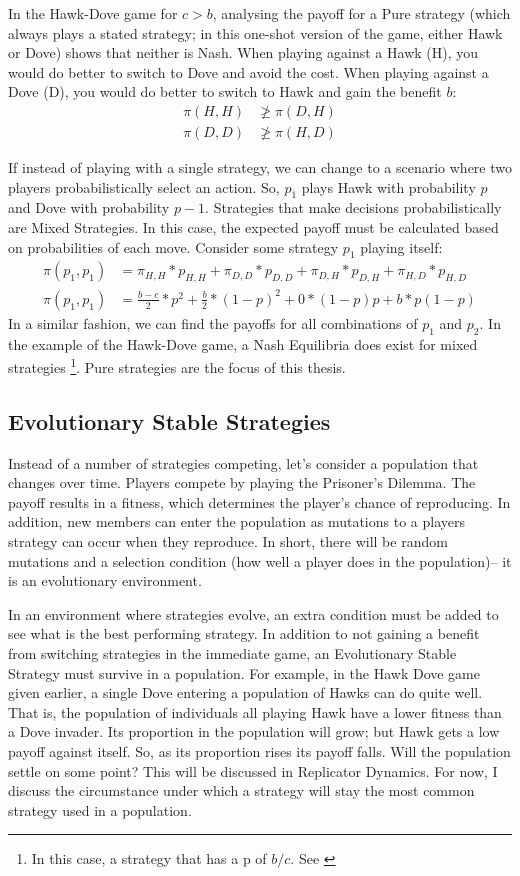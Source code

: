 \documentclass[a4paper,11pt,bcshonoursthesis,singlespace,twoside,thesisdraft,pdflatex]{cssethesis}
\renewcommand{\cite}{\citep} %
\begin{document}
In the Hawk-Dove game for $c>b$, analysing the payoff for a Pure strategy (which always plays a stated strategy; in this one-shot version of the game, either Hawk or Dove) shows that neither is Nash. 
When playing against a Hawk (H), you would do better to switch to Dove and avoid the cost. 
When playing against a Dove (D), you would do better to switch to Hawk and gain the benefit $b$:
\begin{align*}
\pi(H,H)&\ngeq \pi(D,H)\\
\pi(D,D)&\ngeq \pi(H,D)
\end{align*}

If instead of playing with a single strategy, we can change to a scenario where two players probabilistically select an action. So, $p_1$ plays Hawk with probability $p$ and Dove with probability $p-1$. Strategies that make decisions probabilistically are Mixed Strategies. 
In this case, the expected payoff must be calculated based on  probabilities of each move. 
Consider some strategy $p_1$ playing itself: 
\begin{align}
\label{eqn:probabilities}
\pi(p_1,p_1)&=\pi_{H,H}*p_{H,H}+\pi_{D,D}*p_{D,D}+\pi_{D,H}*p_{D,H}+\pi_{H,D}*p_{H,D}\\
\pi(p_1,p_1)&=\frac{b-c}{2}*p^2+\frac{b}{2}*(1-p)^2+0*(1-p)p+b*p(1-p) \nonumber
\end{align}
In a similar fashion, we can find the payoffs for all combinations of $p_1$ and $p_2$. 
In the example of the Hawk-Dove game, a Nash Equilibria does exist for mixed strategies \footnote{In this case, a strategy that has a p of $b/c$. See \cite{nowak2006evolutionary63}}. Pure strategies are the focus of this thesis.

\subsection{Evolutionary Stable Strategies}
Instead of a number of strategies competing, let's consider a population that changes over time. 
Players compete by playing the Prisoner's Dilemma. 
The payoff results in a fitness, which determines the player's chance of reproducing. 
In addition, new members can enter the population as mutations to a players strategy can occur when they reproduce. 
In short, there will be random mutations and a selection condition (how well a player does in the population)-- it is an evolutionary environment. 

In an environment where strategies evolve, an extra condition must be added to see what is the best performing strategy. 
In addition to not gaining a benefit from switching strategies in the immediate game, an Evolutionary Stable Strategy must survive in a population. 
For example, in the Hawk Dove game given earlier, a single Dove entering a population of Hawks can do quite well. 
That is, the population of individuals all playing Hawk have a lower fitness than a Dove invader. 
Its proportion in the population will grow; but Hawk gets a low payoff against itself. 
So, as its proportion rises its payoff falls. 
Will the population settle on some point? This will be discussed in Replicator Dynamics. 
For now, I discuss the circumstance under which a strategy will stay the most common strategy used in a population. 
\end{document}
